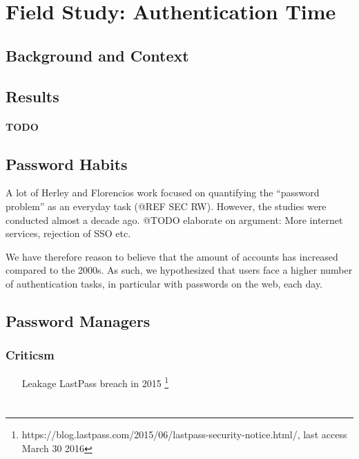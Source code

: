 
\chapter[Field Study: Authentication Time]{Field Study: Authentication Time}\label{sec:auth_time}

\section{Background and Context}
\section{Results}
\subsubsection{TODO}
 \section{Password Habits}
A lot of Herley and Florencios work focused on quantifying the ``password problem'' as an everyday task (@REF SEC RW). However, the studies were conducted almost a decade ago. @TODO elaborate on argument: More internet services, rejection of SSO etc.

We have therefore reason to believe that the amount of accounts has increased compared to the 2000s. As such, we hypothesized that users face a higher number of authentication tasks, in particular with passwords on the web, each day. 


\section{Password Managers}

\subsection{Criticsm}
\begin{itemize}
\item[Leakage] LastPass breach in 2015 \footnote{https://blog.lastpass.com/2015/06/lastpass-security-notice.html/, last access March 30 2016}
\end{itemize}





\chapter{}


